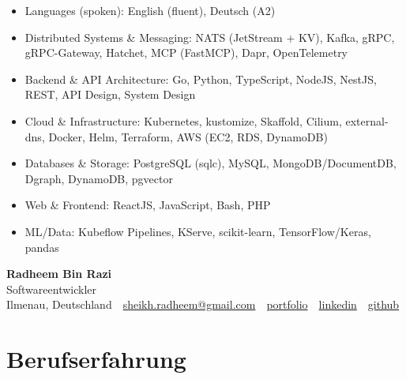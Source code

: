 \documentclass[10pt,a4paper]{resume}
\makeatletter
\newcommand{\Portfolio}{https://radheem.github.io/my-cv}
\newcommand{\PortfolioText}{portfolio}
\newcommand{\GitHub}{https://github.com/radheem}
\newcommand{\LinkedIn}{https://www.linkedin.com/in/radheem-razi}
\newcommand{\Email}{sheikh.radheem@gmail.com}
\makeatother
\begin{document}
\begin{itemize}[leftmargin=1.4em,nosep,topsep=2pt]
  \item Languages (spoken): English (fluent), Deutsch (A2)
  \item Distributed Systems \& Messaging: NATS (JetStream + KV), Kafka, gRPC, gRPC-Gateway, Hatchet, MCP (FastMCP), Dapr, OpenTelemetry
  \item Backend \& API Architecture: Go, Python, TypeScript, NodeJS, NestJS, REST, API Design, System Design
  \item Cloud \& Infrastructure: Kubernetes, kustomize, Skaffold, Cilium, external-dns, Docker, Helm, Terraform, AWS (EC2, RDS, DynamoDB)
  \item Databases \& Storage: PostgreSQL (sqlc), MySQL, MongoDB/DocumentDB, Dgraph, DynamoDB, pgvector
  \item Web \& Frontend: ReactJS, JavaScript, Bash, PHP
  \item ML/Data: Kubeflow Pipelines, KServe, scikit-learn, TensorFlow/Keras, pandas
\end{itemize}

\clearpage
{}

\begin{center}
  {\huge\bfseries Radheem Bin Razi}\\[3pt]
  {\large Softwareentwickler}\\[6pt]
  \small
  Ilmenau, Deutschland \,\textbar\,
  \href{mailto:\Email}{\Email} \,\textbar\,
  \href{\Portfolio}{\PortfolioText} \,\textbar\,
  \href{\LinkedIn}{linkedin} \,\textbar\,
  \href{\GitHub}{github}
\end{center}
\vspace{2pt}

\section{Berufserfahrung}
\end{document}
